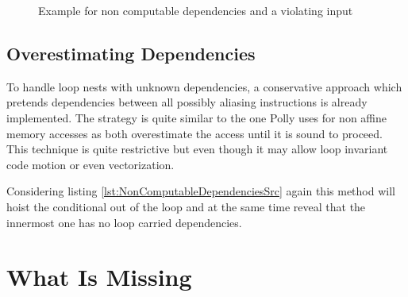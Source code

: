 \lstset{frame=none}
\begin{figure}[htbp]
  \centering
  

  \label{fig:NonComputableDependencies} 
  \caption{Example for non computable dependencies and a violating input}
\end{figure}
\resetlst





\subsection{Overestimating Dependencies}
\label{OverestimatingDependencies}
To handle loop nests with unknown dependencies, a conservative approach which 
pretends dependencies between all possibly aliasing instructions is already 
implemented.
The strategy is quite similar to the one Polly uses for non 
affine memory accesses as both overestimate the access until it is sound to 
proceed. This technique is quite restrictive but even though it may allow
loop invariant code motion or even vectorization. 

Considering listing \ref{lst:NonComputableDependenciesSrc} again this method 
will hoist the conditional out of the loop and at the same time reveal that
the innermost one has no loop carried dependencies. 





\section{What Is Missing}





